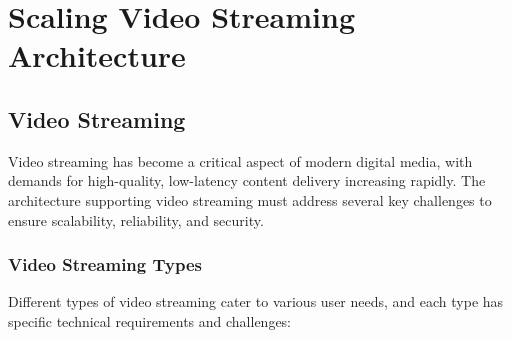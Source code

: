 \chapter{Scaling Video Streaming Architecture}\label{chapter:videostreaming}

\section{Video Streaming}
Video streaming has become a critical aspect of modern digital media, with demands for high-quality, low-latency content delivery increasing rapidly. The architecture supporting video streaming must address several key challenges to ensure scalability, reliability, and security.

\subsection{Video Streaming Types}
Different types of video streaming cater to various user needs, and each type has specific technical requirements and challenges:

